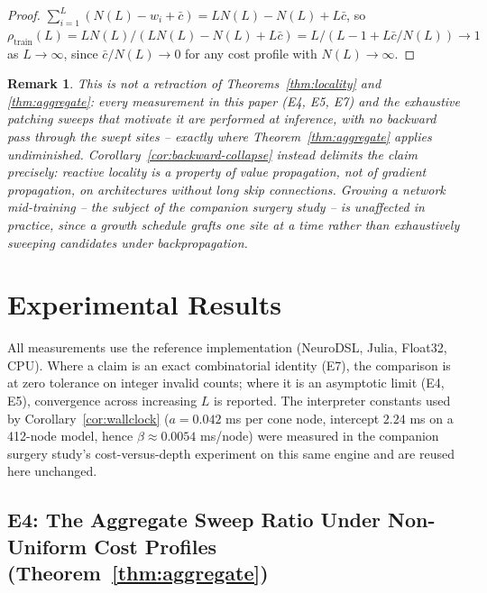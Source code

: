 \documentclass[11pt,a4paper]{article}
\newtheorem{remark}{Remark}
\begin{document}
\begin{proof}
$\sum_{i=1}^L (N(L)-w_i+\bar c) = LN(L) - N(L) + L\bar c$, so $\rho_{\mathrm{train}}(L) =
LN(L)/(LN(L)-N(L)+L\bar c) = L/(L-1+L\bar c/N(L)) \to 1$ as $L\to\infty$, since $\bar c/N(L)\to0$
for any cost profile with $N(L)\to\infty$.
\end{proof}

\begin{remark}
This is not a retraction of Theorems~\ref{thm:locality} and \ref{thm:aggregate}: every measurement
in this paper (E4, E5, E7) and the exhaustive patching sweeps that motivate it are
performed at inference, with no backward pass through the swept sites -- exactly where
Theorem~\ref{thm:aggregate} applies undiminished. Corollary~\ref{cor:backward-collapse} instead
delimits the claim precisely: reactive locality is a property of \emph{value} propagation, not of
\emph{gradient} propagation, on architectures without long skip connections. Growing a network
mid-training -- the subject of the companion surgery study \cite{surgery} -- is unaffected in practice, since a
growth schedule grafts one site at a time rather than exhaustively sweeping candidates under
backpropagation.
\end{remark}

\section{Experimental Results}
\label{sec:experiments}

All measurements use the reference implementation (NeuroDSL, Julia, Float32, CPU). Where a claim
is an exact combinatorial identity (E7), the comparison is at zero tolerance on integer invalid
counts; where it is an asymptotic limit (E4, E5), convergence across increasing $L$ is reported.
The interpreter constants used by Corollary~\ref{cor:wallclock} ($a = 0.042$ ms per cone node,
intercept $2.24$ ms on a 412-node model, hence $\beta \approx 0.0054$ ms/node) were measured in
the companion surgery study's cost-versus-depth experiment \cite{surgery} on this same engine and are reused
here unchanged.

\subsection{E4: The Aggregate Sweep Ratio Under Non-Uniform Cost Profiles (Theorem~\ref{thm:aggregate})}
\label{sec:e4}
\end{document}

